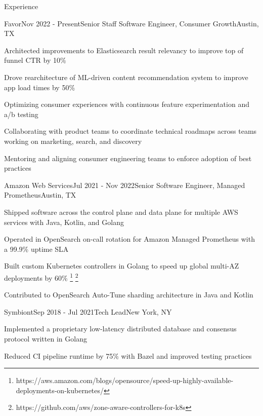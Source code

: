 \documentclass[
	10pt, %
]{resume} %
\begin{document}

\begin{rSection}{Experience}

	\begin{rSubsection}{Favor}{Nov 2022 - Present}{Senior Staff Software Engineer, Consumer Growth}{Austin, TX}
        \item Architected improvements to Elasticsearch result relevancy to improve top of funnel CTR by 10\%
        \item Drove rearchitecture of ML-driven content recommendation system to improve app load times by 50\%
        \item Optimizing consumer experiences with continuous feature experimentation and a/b testing
        \item Collaborating with product teams to coordinate technical roadmaps across teams working on marketing, search, and discovery
        \item Mentoring and aligning consumer engineering teams to enforce adoption of best practices
	\end{rSubsection}


    \begin{rSubsection}{Amazon Web Services}{Jul 2021 - Nov 2022}{Senior Software Engineer, Managed Prometheus}{Austin, TX}
        \item Shipped software across the control plane and data plane for multiple AWS services with Java, Kotlin, and Golang
        \item Operated in OpenSearch on-call rotation for Amazon Managed Prometheus with a 99.9\% uptime SLA
        \item Built custom Kubernetes controllers in Golang to speed up global multi-AZ deployments by 60\% \footnote{https://aws.amazon.com/blogs/opensource/speed-up-highly-available-deployments-on-kubernetes/} \footnote{https://github.com/aws/zone-aware-controllers-for-k8s}
        \item Contributed to OpenSearch Auto-Tune sharding architecture in Java and Kotlin
    \end{rSubsection}
    

    \begin{rSubsection}{Symbiont}{Sep 2018 - Jul 2021}{Tech Lead}{New York, NY}
        \item Implemented a proprietary low-latency distributed database and consensus protocol written in Golang
        \item Reduced CI pipeline runtime by 75\% with Bazel and improved testing practices
    \end{rSubsection}


\end{rSection}
\end{document}
